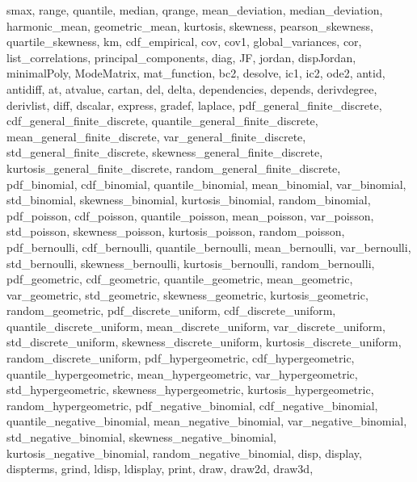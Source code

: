 {{    smax,
    range,
    quantile,
    median,
    qrange,
    mean_deviation,
    median_deviation,
    harmonic_mean,
    geometric_mean,
    kurtosis,
    skewness,
    pearson_skewness,
    quartile_skewness,
    km,
    cdf_empirical,
    cov,
    cov1,
    global_variances,
    cor,
    list_correlations,
    principal_components,
    diag,
    JF,
    jordan,
    dispJordan,
    minimalPoly,
    ModeMatrix,
    mat_function,
    bc2,
    desolve,
    ic1,
    ic2,
    ode2,
    antid,
    antidiff,
    at,
    atvalue,
    cartan,
    del,
    delta,
    dependencies,
    depends,
    derivdegree,
    derivlist,
    diff,
    dscalar,
    express,
    gradef,
    laplace,
    pdf_general_finite_discrete,
    cdf_general_finite_discrete,
    quantile_general_finite_discrete,
    mean_general_finite_discrete,
    var_general_finite_discrete,
    std_general_finite_discrete,
    skewness_general_finite_discrete,
    kurtosis_general_finite_discrete,
    random_general_finite_discrete,
    pdf_binomial,
    cdf_binomial,
    quantile_binomial,
    mean_binomial,
    var_binomial,
    std_binomial,
    skewness_binomial,
    kurtosis_binomial,
    random_binomial,
    pdf_poisson,
    cdf_poisson,
    quantile_poisson,
    mean_poisson,
    var_poisson,
    std_poisson,
    skewness_poisson,
    kurtosis_poisson,
    random_poisson,
    pdf_bernoulli,
    cdf_bernoulli,
    quantile_bernoulli,
    mean_bernoulli,
    var_bernoulli,
    std_bernoulli,
    skewness_bernoulli,
    kurtosis_bernoulli,
    random_bernoulli,
    pdf_geometric,
    cdf_geometric,
    quantile_geometric,
    mean_geometric,
    var_geometric,
    std_geometric,
    skewness_geometric,
    kurtosis_geometric,
    random_geometric,
    pdf_discrete_uniform,
    cdf_discrete_uniform,
    quantile_discrete_uniform,
    mean_discrete_uniform,
    var_discrete_uniform,
    std_discrete_uniform,
    skewness_discrete_uniform,
    kurtosis_discrete_uniform,
    random_discrete_uniform,
    pdf_hypergeometric,
    cdf_hypergeometric,
    quantile_hypergeometric,
    mean_hypergeometric,
    var_hypergeometric,
    std_hypergeometric,
    skewness_hypergeometric,
    kurtosis_hypergeometric,
    random_hypergeometric,
    pdf_negative_binomial,
    cdf_negative_binomial,
    quantile_negative_binomial,
    mean_negative_binomial,
    var_negative_binomial,
    std_negative_binomial,
    skewness_negative_binomial,
    kurtosis_negative_binomial,
    random_negative_binomial,
    disp,
    display,
    dispterms,
    grind,
    ldisp,
    ldisplay,
    print,
    draw,
    draw2d,
    draw3d,
}}
